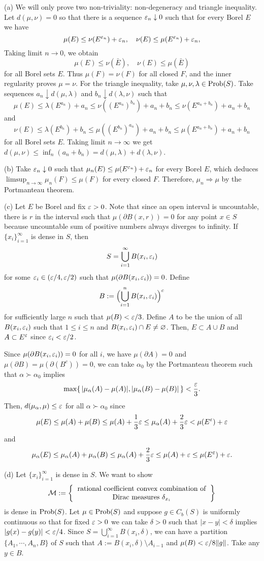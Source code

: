 \documentclass[a4paper]{article}
\begin{document}
\begin{pf}
(a)
We will only prove two non-triviality: non-degeneracy and triangle inequality.
Let $d(\mu,\nu)=0$ so that there is a sequence $\varepsilon_n\downarrow0$ such that for every Borel $E$ we have
\[\mu(E)\le\nu(E^{\varepsilon_n})+\varepsilon_n,\quad\nu(E)\le\mu(E^{\varepsilon_n})+\varepsilon_n,\]
Taking limit $n\to0$, we obtain
\[\mu(E)\le\nu(\bar E),\quad\nu(E)\le\mu(\bar E)\]
for all Borel sets $E$.
Thus $\mu(F)=\nu(F)$ for all closed $F$, and the inner regularity proves $\mu=\nu$.
For the triangle inequality, take $\mu,\nu,\lambda\in\operatorname{Prob}(S)$.
Take sequences $a_n\downarrow d(\mu,\lambda)$ and $b_n\downarrow d(\lambda,\nu)$ such that
\[\mu(E)\le\lambda(E^{a_n})+a_n\le\nu((E^{a_n})^{b_n})+a_n+b_n\le\nu(E^{a_n+b_n})+a_n+b_n\]
and
\[\nu(E)\le\lambda(E^{b_n})+b_n\le\mu((E^{b_n})^{a_n})+a_n+b_n\le\mu(E^{a_n+b_n})+a_n+b_n\]
for all Borel sets $E$.
Taking limit $n\to\infty$ we get $d(\mu,\nu)\le\inf_n(a_n+b_n)=d(\mu,\lambda)+d(\lambda,\nu)$.

(b)
Take $\varepsilon_n\downarrow0$ such that $\mu_n(E)\le\mu(E^{\varepsilon_n})+\varepsilon_n$ for every Borel $E$, which deduces $\limsup_{n\to\infty}\mu_n(F)\le\mu(F)$ for every closed $F$.
Therefore, $\mu_n\Rightarrow\mu$ by the Portmanteau theorem.

(c)
Let $E$ be Borel and fix $\varepsilon>0$.
Note that since an open interval is uncountable, there is $r$ in the interval such that $\mu(\partial B(x,r))=0$ for any point $x\in S$ because uncountable sum of positive numbers always diverges to infinity.
If $\{x_i\}_{i=1}^\infty$ is dense in $S$, then
\[S=\bigcup_{i=1}^\infty B(x_i,\varepsilon_i)\]
for some $\varepsilon_i\in(\varepsilon/4,\varepsilon/2)$ such that $\mu(\partial B(x_i,\varepsilon_i))=0$.
Define
\[B:=\Bigl(\bigcup_{i=1}^nB(x_i,\varepsilon_i)\Bigr)^c\]
for sufficiently large $n$ such that $\mu(B)<\varepsilon/3$.
Define $A$ to be the union of all $B(x_i,\varepsilon_i)$ such that $1\le i\le n$ and $B(x_i,\varepsilon_i)\cap E\ne\varnothing$.
Then, $E\subset A\cup B$ and $A\subset E^\varepsilon$ since $\varepsilon_i<\varepsilon/2$.

Since $\mu(\partial B(x_i,\varepsilon_i))=0$ for all $i$, we have $\mu(\partial A)=0$ and $\mu(\partial B)=\mu(\partial(B^c))=0$, we can take $\alpha_0$ by the Portmanteau theorem such that $\alpha\succ\alpha_0$ implies
\[\max\{\,|\mu_\alpha(A)-\mu(A)|,|\mu_\alpha(B)-\mu(B)|\,\}<\frac{\varepsilon}3.\]
Then, $d(\mu_\alpha,\mu)\le\varepsilon$ for all $\alpha\succ\alpha_0$ since
\[\mu(E)\le\mu(A)+\mu(B)\le\mu(A)+\frac13\varepsilon\le\mu_\alpha(A)+\frac23\varepsilon<\mu(E^\varepsilon)+\varepsilon\]
and
\[\mu_\alpha(E)\le\mu_\alpha(A)+\mu_\alpha(B)\le\mu_\alpha(A)+\frac23\varepsilon\le\mu(A)+\varepsilon\le\mu(E^\varepsilon)+\varepsilon.\]

(d)
Let $\{x_i\}_{i=1}^\infty$ is dense in $S$.
We want to show
\[\cM:=\left\{\begin{tabular}{c}rational coefficient convex combination of\\Dirac measures $\delta_{x_i}$\end{tabular}\right\}\]
is dense in $\operatorname{Prob}(S)$.
Let $\mu\in\operatorname{Prob}(S)$ and suppose $g\in C_b(S)$ is uniformly continuous so that for fixed $\varepsilon>0$ we can take $\delta>0$ such that $|x-y|<\delta$ implies $|g(x)-g(y)|<\varepsilon/4$.
Since $S=\bigcup_{i=1}^\infty B(x_i,\delta)$, we can have a partition $\{A_1,\cdots,A_n,B\}$ of $S$ such that $A:=B(x_i,\delta)\setminus A_{i-1}$ and $\mu(B)<\varepsilon/8\|g\|$.
Take any $y\in B$.


\end{pf}
\end{document}
